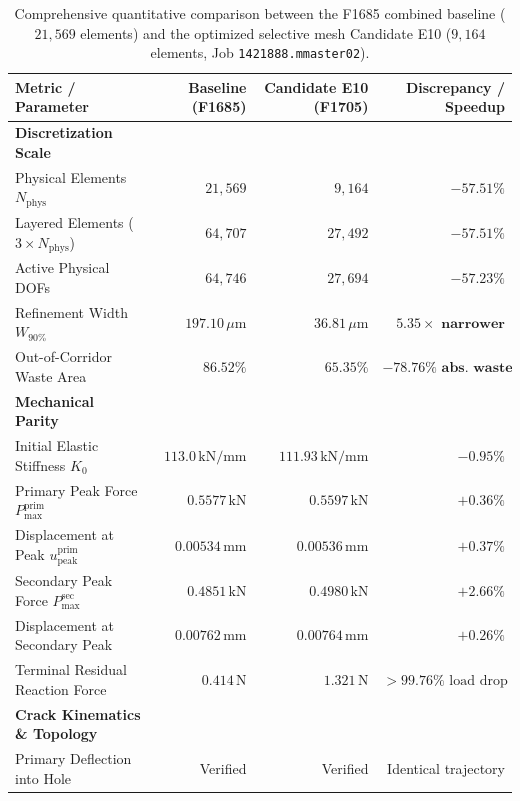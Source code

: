 \begin{table}[htbp]
\centering
\footnotesize
\renewcommand{\arraystretch}{0.84}
\setlength{\tabcolsep}{3.5pt}
\caption{Comprehensive quantitative comparison between the F1685 combined baseline ($21{,}569$ elements) and the optimized selective mesh Candidate E10 ($9{,}164$ elements, Job \texttt{1421888.mmaster02}).}
\label{tab:f1705_candidate_e10_vs_f1685_baseline}
\begin{tabularx}{\textwidth}{Xrrr}
\hline
\textbf{Metric / Parameter} & \textbf{Baseline (F1685)} & \textbf{Candidate E10 (F1705)} & \textbf{Discrepancy / Speedup} \\
\hline
\textbf{Discretization Scale} & & & \\
Physical Elements $N_{\mathrm{phys}}$ & $21{,}569$ & $9{,}164$ & $\mathbf{-57.51\%}$ \\
Layered Elements ($3\times N_{\mathrm{phys}}$) & $64{,}707$ & $27{,}492$ & $\mathbf{-57.51\%}$ \\
Active Physical DOFs & $64{,}746$ & $27{,}694$ & $\mathbf{-57.23\%}$ \\
Refinement Width $W_{90\%}$ & $197.10\,\mu\mathrm{m}$ & $36.81\,\mu\mathrm{m}$ & $\mathbf{5.35\times\text{ narrower}}$ \\
Out-of-Corridor Waste Area & $86.52\%$ & $65.35\%$ & $\mathbf{-78.76\%\text{ abs.\ waste}}$ \\
\hline
\textbf{Mechanical Parity} & & & \\
Initial Elastic Stiffness $K_0$ & $113.0\,\mathrm{kN/mm}$ & $111.93\,\mathrm{kN/mm}$ & $-0.95\%$ \\
Primary Peak Force $P_{\max}^{\mathrm{prim}}$ & $0.5577\,\mathrm{kN}$ & $0.5597\,\mathrm{kN}$ & $\mathbf{+0.36\%}$ \\
Displacement at Peak $u_{\mathrm{peak}}^{\mathrm{prim}}$ & $0.00534\,\mathrm{mm}$ & $0.00536\,\mathrm{mm}$ & $\mathbf{+0.37\%}$ \\
Secondary Peak Force $P_{\max}^{\mathrm{sec}}$ & $0.4851\,\mathrm{kN}$ & $0.4980\,\mathrm{kN}$ & $+2.66\%$ \\
Displacement at Secondary Peak & $0.00762\,\mathrm{mm}$ & $0.00764\,\mathrm{mm}$ & $+0.26\%$ \\
Terminal Residual Reaction Force & $0.414\,\mathrm{N}$ & $1.321\,\mathrm{N}$ & $>99.76\%\text{ load drop}$ \\
\hline
\textbf{Crack Kinematics \& Topology} & & & \\
Primary Deflection into Hole & Verified & Verified & Identical trajectory \\

\end{tabularx}
\end{table}
